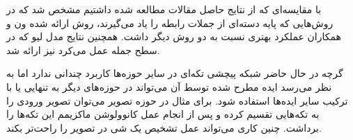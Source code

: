 \documentclass[12pt, a4paper, openany]{book}
\begin{document}
با مقایسه‌ای که از نتایج حاصل مقالات مطالعه شده داشتیم مشخص شد که در روش‌هایی که پایه
دسته‌ای از جملات رابطه را یاد می‌گیرند، روش ارائه شده ون و همکاران
عملکرد بهتری نسبت به دو روش دیگر داشت. همچنین نتایج مدل لیو که در سطح جمله عمل می‌کرد نیز ارائه شد.

گرچه در حال حاضر شبکه پیچشی تکه‌ای در سایر حوزه‌ها کاربرد چندانی ندارد اما به نظر می‌رسد
ایده مطرح شده توسط آن می‌تواند در حوزه‌های دیگر به تنهایی یا با ترکیب سایر ایده‌ها استفاده شود.
برای مثال در حوزه تصویر می‌توان تصویر ورودی را به تکه‌هایی تقسیم کرده و پس از انجام عمل کانوولوشن
ماکزیمم این تکه‌ها را برداشت. چنین کاری می‌تواند عمل تشخیص یک شی در تصویر را راحت‌تر بکند.



\end{document}
